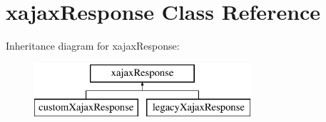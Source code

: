 \hypertarget{classxajaxResponse}{
\section{xajaxResponse Class Reference}
\label{classxajaxResponse}
}
Inheritance diagram for xajaxResponse:\begin{figure}[H]
\begin{center}
\leavevmode
\includegraphics[height=2.000000cm]{classxajaxResponse}
\end{center}
\end{figure}
